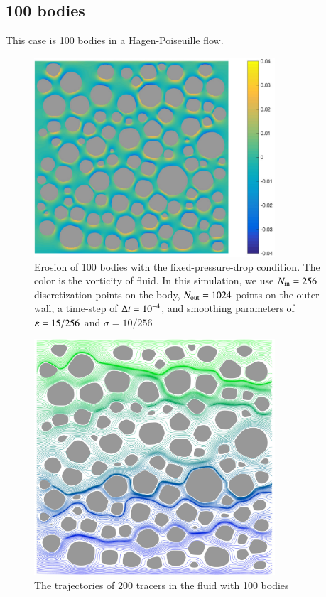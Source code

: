 \documentclass[preprint, 10pt]{elsarticle}
\begin{document}
\subsection{100 bodies}
{\color{red}
This case is 100 bodies in a Hagen-Poiseuille flow.
}
\begin{figure}[H]
\begin{center}
\includegraphics[width = 0.8\textwidth]{./figs/100b_50}
\caption{\label{fig:Eroding100vort} Erosion of 100 bodies with the fixed-pressure-drop condition. The color is the vorticity of fluid. In this simulation, we use $N_{\mathrm{in}} = 256$ discretization points on the body, $N_{\mathrm{out}} = 1024$ points on the outer wall, a time-step of $\Delta t=10^{-4}$, and smoothing parameters of $\varepsilon= 15/256$ and $\sigma=10/256 $}
\end{center}
\end{figure}
\begin{figure}[H]
\begin{center}
\includegraphics[width = 0.8\textwidth]{./figs/100b_t100tracer}
\caption{\label{fig:Eroding100tracer} The trajectories of 200 tracers in the fluid with 100 bodies}
\end{center}
\end{figure}
\end{document}
